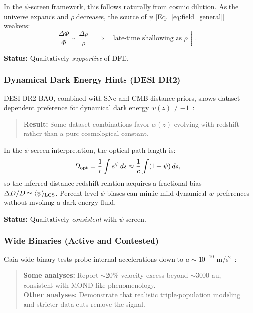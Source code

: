In the $\psi$-screen framework, this follows naturally from cosmic dilution. 
As the universe expands and $\rho$ decreases, the source of $\psi$ 
[Eq.~\eqref{eq:field_general}] weakens:
\begin{equation}
\frac{\Delta\Phi}{\Phi} \sim \frac{\Delta\rho}{\rho} \quad \Rightarrow \quad 
\text{late-time shallowing as } \rho \downarrow.
\end{equation}

\textbf{Status:} Qualitatively \textit{supportive} of DFD.

\subsubsection{Dynamical Dark Energy Hints (DESI DR2)}

DESI DR2 BAO, combined with SNe and CMB distance priors, shows dataset-dependent 
preference for dynamical dark energy $w(z) \neq -1$~\cite{DESI2025DR2}:

\begin{quote}
\textbf{Result:} Some dataset combinations favor $w(z)$ evolving with redshift 
rather than a pure cosmological constant.
\end{quote}

In the $\psi$-screen interpretation, the optical path length is:
\begin{equation}
D_{\rm opt} = \frac{1}{c}\int e^\psi\,ds \approx \frac{1}{c}\int(1 + \psi)\,ds,
\end{equation}
so the inferred distance-redshift relation acquires a fractional bias 
$\Delta D/D \simeq \langle\psi\rangle_{\rm LOS}$. Percent-level $\psi$ biases 
can mimic mild dynamical-$w$ preferences without invoking a dark-energy fluid.

\textbf{Status:} Qualitatively \textit{consistent} with $\psi$-screen.

\subsubsection{Wide Binaries (Active and Contested)}

Gaia wide-binary tests probe internal accelerations down to 
$a \sim 10^{-10}$ m/s$^2$~\cite{WideBinaries2025}:

\begin{quote}
\textbf{Some analyses:} Report $\sim$20\% velocity excess beyond $\sim$3000 au, 
consistent with MOND-like phenomenology.\\
\textbf{Other analyses:} Demonstrate that realistic triple-population 
modeling and stricter data cuts remove the signal.
\end{quote}

